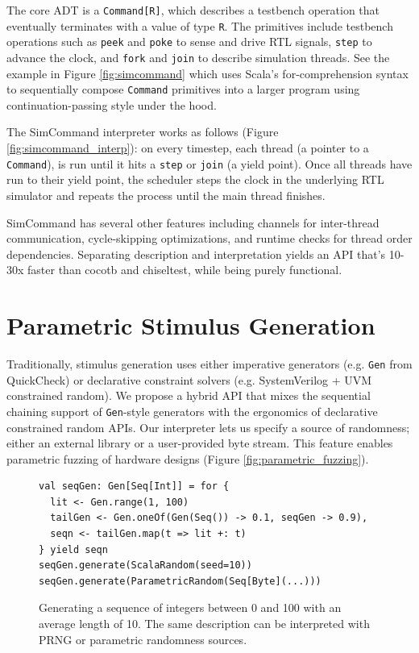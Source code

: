 \documentclass[sigplan,review,nonacm,9pt]{acmart}
\begin{document}
The core ADT is a \texttt{Command[R]}, which describes a testbench operation that eventually terminates with a value of type \texttt{R}.
The primitives include testbench operations such as \texttt{peek} and \texttt{poke} to sense and drive RTL signals, \texttt{step} to advance the clock, and \texttt{fork} and \texttt{join} to describe simulation threads.
See the example in Figure \ref{fig:simcommand} which uses Scala's for-comprehension syntax to sequentially compose \texttt{Command} primitives into a larger program using continuation-passing style under the hood.

The SimCommand interpreter works as follows (Figure \ref{fig:simcommand_interp}): on every timestep, each thread (a pointer to a \texttt{Command}), is run until it hits a \texttt{step} or \texttt{join} (a yield point).
Once all threads have run to their yield point, the scheduler steps the clock in the underlying RTL simulator and repeats the process until the main thread finishes.

SimCommand has several other features including channels for inter-thread communication, cycle-skipping optimizations, and runtime checks for thread order dependencies.
Separating description and interpretation yields an API that's 10-30x faster than cocotb and chiseltest, while being purely functional.


\section{Parametric Stimulus Generation}

Traditionally, stimulus generation uses either imperative generators (e.g. \texttt{Gen} from QuickCheck\cite{quickcheck}) or declarative constraint solvers (e.g. SystemVerilog + UVM constrained random\cite{riscv_dv}).
We propose a hybrid API that mixes the sequential chaining support of \texttt{Gen}-style generators with the ergonomics of declarative constrained random APIs.
Our interpreter lets us specify a source of randomness; either an external library or a user-provided byte stream.
This feature enables parametric fuzzing\cite{zest} of hardware designs (Figure \ref{fig:parametric_fuzzing}).

\begin{figure}[b]
\begin{verbatim}
val seqGen: Gen[Seq[Int]] = for {
  lit <- Gen.range(1, 100)
  tailGen <- Gen.oneOf(Gen(Seq()) -> 0.1, seqGen -> 0.9),
  seqn <- tailGen.map(t => lit +: t)
} yield seqn
seqGen.generate(ScalaRandom(seed=10))
seqGen.generate(ParametricRandom(Seq[Byte](...)))
\end{verbatim}
\caption{Generating a sequence of integers between 0 and 100 with an average length of 10. The same description can be interpreted with PRNG or parametric randomness sources.}
\label{fig:randomapi}
\end{figure}
\end{document}
